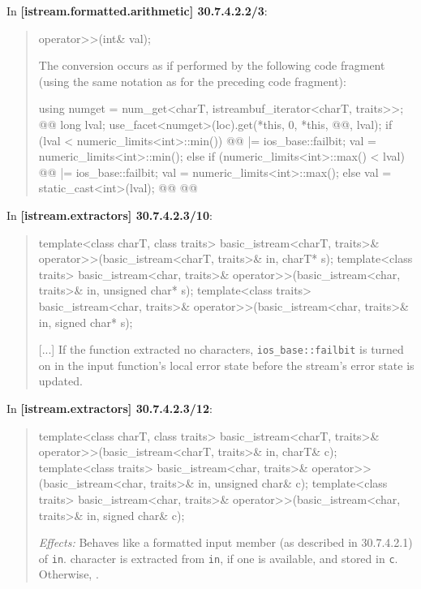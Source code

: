 \documentclass{wg21}
\begin{document}
In \textbf{[istream.formatted.arithmetic] 30.7.4.2.2/3}:
\begin{quote}
\begin{codeblock}
operator>>(int& val);
\end{codeblock}
The conversion occurs as if performed by the following code fragment (using the
same notation as for the preceding code fragment):
\begin{codeblock}
  using numget = num_get<charT, istreambuf_iterator<charT, traits>>;
  @@
  long lval;
  use_facet<numget>(loc).get(*this, 0, *this, @@, lval);
  if (lval < numeric_limits<int>::min()) {
    @@ |= ios_base::failbit;
    val = numeric_limits<int>::min();
  } else if (numeric_limits<int>::max() < lval) {
    @@ |= ios_base::failbit;
    val = numeric_limits<int>::max();
  }  else
    val = static_cast<int>(lval);
  @\added{\}}@
  @@
\end{codeblock}
\end{quote}

In \textbf{[istream.extractors] 30.7.4.2.3/10}:
\begin{quote}
\begin{codeblock}
template<class charT, class traits>
  basic_istream<charT, traits>& operator>>(basic_istream<charT, traits>& in, charT* s);
template<class traits>
  basic_istream<char, traits>& operator>>(basic_istream<char, traits>& in, unsigned char* s);
template<class traits>
  basic_istream<char, traits>& operator>>(basic_istream<char, traits>& in, signed char* s);
\end{codeblock}
[...]
If the function extracted no characters, 
{\texttt{ios_base::failbit} is turned on in the input function's local error state
before the stream's error state is updated}.
\end{quote}

In \textbf{[istream.extractors] 30.7.4.2.3/12}:
\begin{quote}
\begin{codeblock}
template<class charT, class traits>
  basic_istream<charT, traits>& operator>>(basic_istream<charT, traits>& in, charT& c);
template<class traits>
  basic_istream<char, traits>& operator>>(basic_istream<char, traits>& in, unsigned char& c);
template<class traits>
  basic_istream<char, traits>& operator>>(basic_istream<char, traits>& in, signed char& c);
\end{codeblock}
\textit{Effects:} Behaves like a formatted input member (as described in 30.7.4.2.1)
of \texttt{in}.  character
is extracted from \texttt{in}, if one is available, and stored in \texttt{c}.
Otherwise, .
\end{quote}
\end{document}
